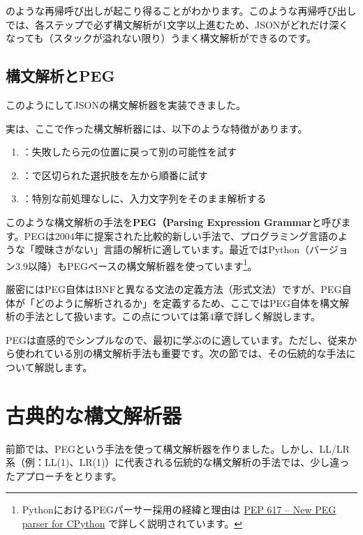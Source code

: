 \noindent のような再帰呼び出しが起こり得ることがわかります。このような再帰呼び出しでは、各ステップで必ず構文解析が1文字以上進むため、JSONがどれだけ深くなっても（スタックが溢れない限り）うまく構文解析ができるのです。

\subsection{構文解析とPEG}

このようにしてJSONの構文解析器を実装できました。

実は、ここで作った構文解析器には、以下のような特徴があります。

\begin{enumerate}
\item
  ：失敗したら元の位置に戻って別の可能性を試す
\item
  ：\texttt{\textbar{}}で区切られた選択肢を左から順番に試す
\item
  ：特別な前処理なしに、入力文字列をそのまま解析する
\end{enumerate}

このような構文解析の手法を\textbf{\sffamily PEG（Parsing Expression
Grammar}と呼びます。PEGは2004年に提案された比較的新しい手法で、プログラミング言語のような「曖昧さがない」言語の解析に適しています。最近ではPython（バージョン3.9以降）もPEGベースの構文解析器を使っています\footnote{PythonにおけるPEGパーサー採用の経緯と理由は
  \href{https://peps.python.org/pep-0617/}{PEP 617 -- New PEG parser for
  CPython} で詳しく説明されています。}。

厳密にはPEG自体はBNFと異なる文法の定義方法（形式文法）ですが、PEG自体が「どのように解析されるか」を定義するため、ここではPEG自体を構文解析の手法として扱います。この点については第4章で詳しく解説します。

PEGは直感的でシンプルなので、最初に学ぶのに適しています。ただし、従来から使われている別の構文解析手法も重要です。次の節では、その伝統的な手法について解説します。

\section{古典的な構文解析器}

前節では、PEGという手法を使って構文解析器を作りました。しかし、LL/LR系（例：LL(1)、LR(1)）に代表される伝統的な構文解析の手法では、少し違ったアプローチをとります。

